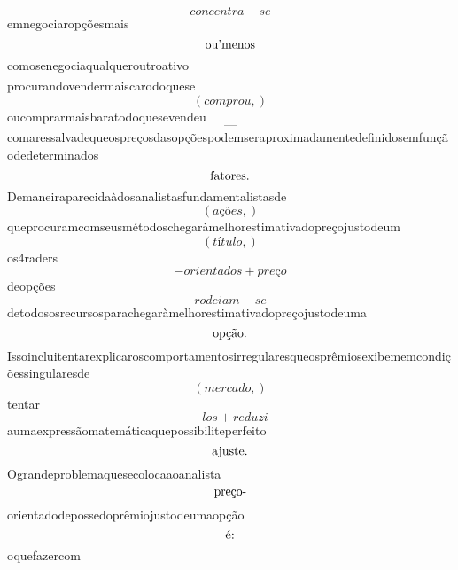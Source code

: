 \documentclass{article}
\begin{document}
\begin{equation}
concentra - se
\end{equation}emnegociaropçõesmais\begin{equation}
$ou'menos$
\end{equation}comosenegociaqualqueroutroativo\begin{equation}
—
\end{equation}procurandovendermaiscarodoquese\begin{equation}
\left( comprou,\right)
\end{equation}oucomprarmaisbaratodoquesevendeu\begin{equation}
—
\end{equation}comaressalvadequeospreçosdasopçõespodemseraproximadamentedefinidosemfunçãodedeterminados\begin{equation}
$fatores.$
\end{equation}Demaneiraparecidaàdosanalistasfundamentalistasde\begin{equation}
\left( ações,\right)
\end{equation}queprocuramcomseusmétodoschegaràmelhorestimativadopreçojustodeum\begin{equation}
\left( título,\right)
\end{equation}os4raders\begin{equation}
- orientados + preço
\end{equation}deopções\begin{equation}
rodeiam - se
\end{equation}detodososrecursosparachegaràmelhorestimativadopreçojustodeuma\begin{equation}
$opção.$
\end{equation}Issoincluitentarexplicaroscomportamentosirregularesqueosprêmiosexibememcondiçõessingularesde\begin{equation}
\left( mercado,\right)
\end{equation}tentar\begin{equation}
- los + reduzi
\end{equation}aumaexpressãomatemáticaquepossibiliteperfeito\begin{equation}
$ajuste.$
\end{equation}Ograndeproblemaquesecolocaaoanalista\begin{equation}
$preço-$
\end{equation}orientadodepossedoprêmiojustodeumaopção\begin{equation}
$é:$
\end{equation}oquefazercom\begin{equation}

\end{equation}
\end{document}
